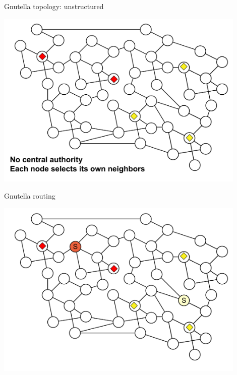 \begin{frame}{Gnutella topology: unstructured}
	
\includegraphics[width=0.9\textwidth]{figs/10/gnutella1}

\end{frame}


\begin{frame}{Gnutella routing}
	
\includegraphics[width=0.9\textwidth]{figs/10/gnutella2}

\end{frame}

